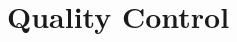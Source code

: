 \documentclass[a4paper,11pt]{report}
\begin{document}
\chapter{Quality Control}







\printindex

%
\end{document}

